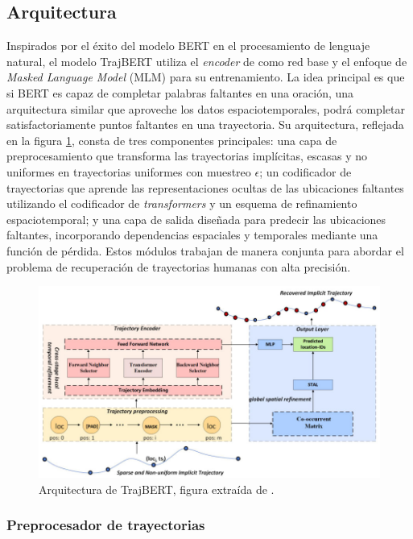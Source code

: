 \subsection{Arquitectura}

Inspirados por el éxito del modelo BERT \cite{devlin2018bert} en el procesamiento de lenguaje natural, el modelo TrajBERT utiliza el \textit{encoder} de \cite{vaswani2017attention} como red base y el enfoque de \textit{Masked Language Model} (MLM) para su entrenamiento. La idea principal es que si BERT es capaz de completar palabras faltantes en una oración, una arquitectura similar que aproveche los datos espaciotemporales, podrá completar satisfactoriamente puntos faltantes en una trayectoria. Su arquitectura, reflejada en la figura \ref{fig:trajbert_architecture}, consta de tres componentes principales: una capa de preprocesamiento que transforma las trayectorias implícitas, escasas y no uniformes en trayectorias uniformes con muestreo $\epsilon$; un codificador de trayectorias que aprende las representaciones ocultas de las ubicaciones faltantes utilizando el codificador de \textit{transformers} y un esquema de refinamiento espaciotemporal; y una capa de salida diseñada para predecir las ubicaciones faltantes, incorporando dependencias espaciales y temporales mediante una función de pérdida. Estos módulos trabajan de manera conjunta para abordar el problema de recuperación de trayectorias humanas con alta precisión.

\begin{figure}[!htb] \centering \includegraphics[width=1\textwidth]{Graphics/trajbert_architecture.jpg} \caption{Arquitectura de TrajBERT, figura extraída de \cite{si2023trajbert}.} \label{fig:trajbert_architecture} 
\end{figure}

\subsubsection{Preprocesador de trayectorias}

